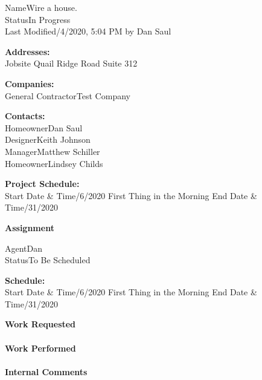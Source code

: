 \documentclass[10pt, letterpaper, twoside]{article}
\newcommand\mydotfill{\cftdotfill{\cftdotsep}}
\begin{document}
	\begin{multicols}{2}
		\begin{minipage}{\columnwidth}
		Name\enspace\mydotfill\enspace Wire a house.  \\
		Status\enspace\mydotfill\enspace In Progress \\
		Last Modified\enspace\mydotfill{}/4/2020, 5:04 PM by Dan Saul \\
		\end{minipage}
		\begin{minipage}{\columnwidth}
		\textbf{Addresses:} \\
		Jobsite\enspace\mydotfill{} Quail Ridge Road Suite 312 \\
		\end{minipage}
		\begin{minipage}{\columnwidth}
		\textbf{Companies:} \\
		General Contractor\enspace\mydotfill\enspace  Test Company  \\
		\end{minipage}
		\begin{minipage}{\columnwidth}
		\textbf{Contacts:} \\
		Homeowner\enspace\mydotfill\enspace Dan Saul \\
		Designer\enspace\mydotfill\enspace Keith Johnson \\
		Manager\enspace\mydotfill\enspace Matthew Schiller \\
		Homeowner\enspace\mydotfill\enspace Lindsey Childs \\
		\end{minipage}
		\begin{minipage}{\columnwidth}
		\textbf{Project Schedule:} \\
		Start Date \& Time\enspace\mydotfill{}/6/2020 First Thing in the Morning
		End Date \& Time\enspace\mydotfill{}/31/2020
		\end{minipage}
	\end{multicols}
	\vspace{-.7\baselineskip}
	\textbf{Assignment}\hrulefill
	\begin{multicols}{2}
		Agent\enspace\mydotfill\enspace Dan  \\
		Status\enspace\mydotfill\enspace To Be Scheduled \\
		\begin{minipage}{\columnwidth}
			\textbf{Schedule:} \\
			Start Date \& Time\enspace\mydotfill{}/6/2020 First Thing in the Morning
			End Date \& Time\enspace\mydotfill{}/31/2020
		\end{minipage}
	\end{multicols}
	\vspace{-.7\baselineskip}
	\textbf{Work Requested}\hrulefill\medskip \\
	\blindtext \medskip\\
	\textbf{Work Performed}\hrulefill\medskip \\
	\blindtext \medskip\\
	\textbf{Internal Comments}\hrulefill\medskip \\
	\blindtext \medskip
\end{document}
